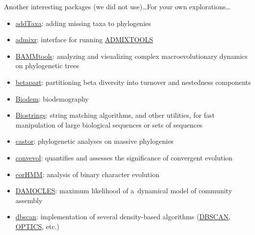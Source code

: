 \documentclass[compress, xelatex, 11pt, xcolor=svgnames, aspectratio=169,
	hyperref={
		bookmarks=true,
		unicode=true,
		colorlinks=true,
		pdftitle={Molecular data in R},
		plainpages=false,
		pdfauthor={Vojtech Zeisek},
		pdfsubject={Course about phylogeny and evolution in R},
		pdfcreator={XeLaTeX},
		pdfkeywords={R, evolution, phylogeny, molecular data},
		linkcolor=Crimson, %
		anchorcolor=Magenta, %
		citecolor=Magenta, %
		filecolor=Magenta, %
		menucolor=Magenta, %
		urlcolor=DodgerBlue, %
		},
	url={hyphens, lowtilde} %
	]{beamer}
\begin{document}
\begin{frame}[allowframebreaks]{Another interesting packages (we did not use)\ldots}{For your own explorations\ldots}
	\begin{itemize}
		\item \href{https://github.com/eliotmiller/addTaxa}{addTaxa}: adding missing taxa to phylogenies
		\item \href{https://CRAN.R-project.org/package=admixr}{admixr}: interface for running \href{https://academic.oup.com/genetics/article/192/3/1065/5935193}{ADMIXTOOLS}
		\item \href{https://CRAN.R-project.org/package=BAMMtools}{BAMMtools}: analyzing and visualizing complex macroevolutionary dynamics on phylogenetic trees
		\item \href{https://CRAN.R-project.org/package=betapart}{betapart}: partitioning beta diversity into turnover and nestedness components
		\item \href{https://CRAN.R-project.org/package=Biodem}{Biodem}: biodemography
		\item \href{https://www.bioconductor.org/packages/release/bioc/html/Biostrings.html}{Biostrings}: string matching algorithms, and other utilities, for fast manipulation of large biological sequences or sets of sequences
		\item \href{https://CRAN.R-project.org/package=castor}{castor}: phylogenetic analyses on massive phylogenies
		\item \href{https://CRAN.R-project.org/package=convevol}{convevol}: quantifies and assesses the significance of convergent evolution
		\item \href{https://CRAN.R-project.org/package=corHMM}{corHMM}: analysis of binary character evolution
		\item \href{https://CRAN.R-project.org/package=DAMOCLES}{DAMOCLES}: maximum likelihood of a~dynamical model of community assembly
		\item \href{https://CRAN.R-project.org/package=dbscan}{dbscan}: implementation of several density-based algorithms (\href{https://en.wikipedia.org/wiki/DBSCAN}{DBSCAN}, \href{https://en.wikipedia.org/wiki/OPTICS_algorithm}{OPTICS}, etc.)

\end{itemize}
\end{frame}
\end{document}
